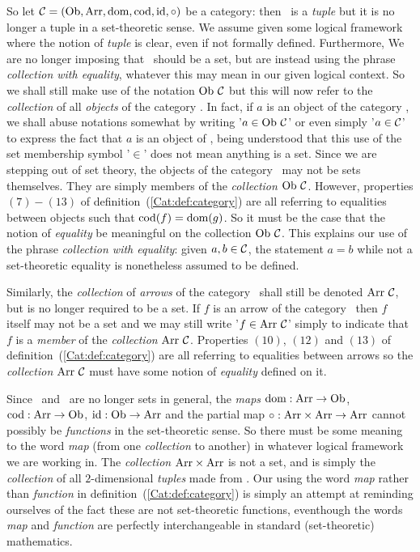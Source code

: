\newpage
So let $\mbox{$\cal C$}=(\mbox{\rm Ob}, \mbox{\rm Arr}, \mbox{\rm dom}, \mbox{\rm cod}, \mbox{\rm id}, \circ)$ be a category: then \Cat\ is 
a {\em tuple} but it is no longer a tuple in a set-theoretic sense. We assume
given some logical framework where the notion of {\em tuple} is clear, even
if not formally defined. Furthermore, We are no longer imposing that \ob\ 
should be a set, but are instead using the phrase {\em collection with 
equality}, whatever this may mean in our given logical context. So we shall 
still make use of the notation $\mbox{\rm Ob}\ \mbox{$\cal C$}$ but this will now refer to the 
{\em collection} of all {\em objects} of the category \Cat. In fact, if
$a$ is an object of the category \Cat, we shall abuse notations somewhat
by writing '$a\in\mbox{\rm Ob}\ \mbox{$\cal C$}$' or even simply '$a\in\mbox{$\cal C$}$' to express the fact 
that $a$ is an object of \Cat, being understood that this use of the
set membership symbol '$\in$' does not mean anything is a set. Since we 
are stepping out of set theory, the objects of the category \Cat\ may not
be sets themselves. They are simply members of the {\em collection} 
$\mbox{\rm Ob}\ \mbox{$\cal C$}$. However, properties $(7)-(13)$ of 
definition~(\ref{Cat:def:category}) are all referring to equalities
between objects such that $\mbox{\rm cod}(f)=\mbox{\rm dom}(g)$. So it must be the case that 
the notion of {\em equality} be meaningful on the collection $\mbox{\rm Ob}\ \mbox{$\cal C$}$. 
This explains our use of the phrase {\em collection with equality}: given
$a,b\in\mbox{$\cal C$}$, the statement $a=b$ while not a set-theoretic equality is 
nonetheless assumed to be defined. 

Similarly, the {\em collection} of
{\em arrows} of the category \Cat\ shall still be denoted $\arr\ \Cat$,
but is no longer required to be a set. If $f$ is an arrow of the category
\Cat\ then $f$ itself may not be a set and we may still write '$f\in\mbox{\rm Arr}\ \mbox{$\cal C$}$'
simply to indicate that $f$ is a {\em member} of the {\em collection}
$\arr\ \Cat$. Properties $(10)$, $(12)$ and $(13)$ of 
definition~(\ref{Cat:def:category}) are all referring to equalities 
between arrows so the {\em collection} $\arr\ \Cat$ must have some notion
of {\em equality} defined on it. 

Since \ob\ and \arr\ are no longer sets in general, the {\em maps} 
$\mbox{\rm dom}:\mbox{\rm Arr}\to\mbox{\rm Ob}$, $\mbox{\rm cod}:\mbox{\rm Arr}\to\mbox{\rm Ob}$, $\mbox{\rm id}:\mbox{\rm Ob}\to\mbox{\rm Arr}$ and the partial map 
$\circ:\mbox{\rm Arr}\times\mbox{\rm Arr}\to\mbox{\rm Arr}$ cannot possibly be {\em functions} in the 
set-theoretic sense. So there must be some meaning to the word {\em map}
(from one {\em collection} to another) in whatever logical framework
we are working in. The {\em collection} $\mbox{\rm Arr}\times\mbox{\rm Arr}$ is not a set, 
and is simply the {\em collection} of all $2$-dimensional {\em tuples}
made from \arr. Our using the word {\em map} rather than {\em function}
in definition~(\ref{Cat:def:category}) is simply an attempt at reminding
ourselves of the fact these are not set-theoretic functions, eventhough
the words {\em map} and {\em function} are perfectly interchangeable in 
standard (set-theoretic) mathematics. 

